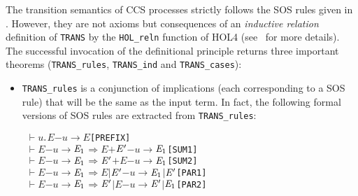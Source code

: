 \documentclass[GCNS]{yincog}
\renewcommand{\HOLinline}[1]{\mbox{\textup{\texttt{#1}}}}
\renewcommand{\HOLConst}[1]{\texttt{#1}}
\renewcommand{\HOLFreeVar}[1]{\ensuremath{\mathit{#1}}}
\renewcommand{\HOLSymConst}[1]{#1}
\renewcommand{\HOLTokenTurnstile}{\ensuremath{\:\:\vdash}}
\theoremstyle{remark}
\theoremstyle{theorem}
\theoremstyle{remark}
\newcommand{\HOLTokenTransBegin}{$-$}
\newcommand{\HOLTokenTransEnd}{$\rightarrow$\xspace}
\renewcommand{\HOLTokenImp}{\ensuremath{\Longrightarrow}}
\begin{document}
The transition semantics of CCS processes strictly follows the SOS rules
given in . However, they are not axioms but consequences
of an \emph{inductive relation} definition of
\HOLinline{\HOLConst{TRANS}} by the \texttt{HOL\_reln} function of HOL4
(see~\citep[p.~219]{holdesc} for more details). The successful invocation
of the definitional principle returns three important theorems (\texttt{TRANS\_rules},
\texttt{TRANS\_ind} and \texttt{TRANS\_cases}):
%
\begin{itemize}
%
\item \texttt{TRANS\_rules} is a conjunction of implications (each corresponding
to a SOS rule) that will be the same as the input term. In fact, the following
formal versions of SOS rules are extracted from \texttt{TRANS\_rules}:
%
\begin{alltt}
\HOLTokenTurnstile{} \HOLFreeVar{u}\HOLSymConst{\ensuremath{\ldotp}}\HOLFreeVar{E} \HOLTokenTransBegin\HOLFreeVar{u}\HOLTokenTransEnd \HOLFreeVar{E}\hfill\texttt{[PREFIX]}
\HOLTokenTurnstile{} \HOLFreeVar{E} \HOLTokenTransBegin\HOLFreeVar{u}\HOLTokenTransEnd \ensuremath{\HOLFreeVar{E}\sb{\mathrm{1}}} \HOLSymConst{\HOLTokenImp{}} \HOLFreeVar{E} \HOLSymConst{\ensuremath{+}} \ensuremath{\HOLFreeVar{E}\sp{\prime}} \HOLTokenTransBegin\HOLFreeVar{u}\HOLTokenTransEnd \ensuremath{\HOLFreeVar{E}\sb{\mathrm{1}}}\hfill\texttt{[SUM1]}
\HOLTokenTurnstile{} \HOLFreeVar{E} \HOLTokenTransBegin\HOLFreeVar{u}\HOLTokenTransEnd \ensuremath{\HOLFreeVar{E}\sb{\mathrm{1}}} \HOLSymConst{\HOLTokenImp{}} \ensuremath{\HOLFreeVar{E}\sp{\prime}} \HOLSymConst{\ensuremath{+}} \HOLFreeVar{E} \HOLTokenTransBegin\HOLFreeVar{u}\HOLTokenTransEnd \ensuremath{\HOLFreeVar{E}\sb{\mathrm{1}}}\hfill\texttt{[SUM2]}
\HOLTokenTurnstile{} \HOLFreeVar{E} \HOLTokenTransBegin\HOLFreeVar{u}\HOLTokenTransEnd \ensuremath{\HOLFreeVar{E}\sb{\mathrm{1}}} \HOLSymConst{\HOLTokenImp{}} \HOLFreeVar{E} \HOLSymConst{\ensuremath{\mid}} \ensuremath{\HOLFreeVar{E}\sp{\prime}} \HOLTokenTransBegin\HOLFreeVar{u}\HOLTokenTransEnd \ensuremath{\HOLFreeVar{E}\sb{\mathrm{1}}} \HOLSymConst{\ensuremath{\mid}} \ensuremath{\HOLFreeVar{E}\sp{\prime}}\hfill\texttt{[PAR1]}
\HOLTokenTurnstile{} \HOLFreeVar{E} \HOLTokenTransBegin\HOLFreeVar{u}\HOLTokenTransEnd \ensuremath{\HOLFreeVar{E}\sb{\mathrm{1}}} \HOLSymConst{\HOLTokenImp{}} \ensuremath{\HOLFreeVar{E}\sp{\prime}} \HOLSymConst{\ensuremath{\mid}} \HOLFreeVar{E} \HOLTokenTransBegin\HOLFreeVar{u}\HOLTokenTransEnd \ensuremath{\HOLFreeVar{E}\sp{\prime}} \HOLSymConst{\ensuremath{\mid}} \ensuremath{\HOLFreeVar{E}\sb{\mathrm{1}}}\hfill\texttt{[PAR2]}

\end{alltt}
\end{itemize}
\end{document}
